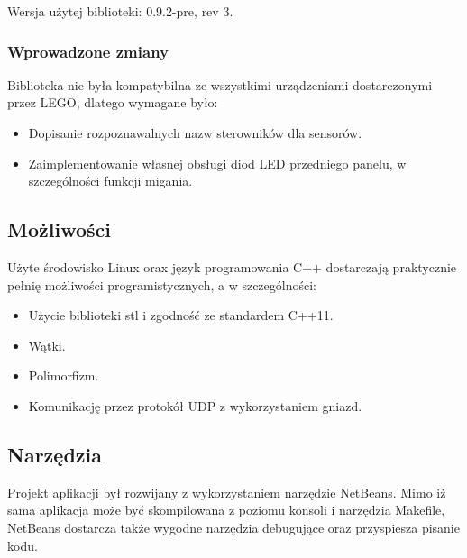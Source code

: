 \noindent Wersja użytej biblioteki: 0.9.2-pre, rev 3.

\subsubsection{Wprowadzone zmiany}
Biblioteka nie była kompatybilna ze wszystkimi urządzeniami dostarczonymi przez LEGO, dlatego wymagane było:
\begin{itemize}
    \item Dopisanie rozpoznawalnych nazw sterowników dla sensorów.
    \item Zaimplementowanie własnej obsługi diod LED przedniego panelu, w szczególności funkcji migania.
\end{itemize}

\subsection{Możliwości}
Użyte środowisko Linux orax język programowania C++ dostarczają praktycznie pełnię możliwości programistycznych, a w szczególności:
\begin{itemize}
    \item Użycie biblioteki stl i zgodność ze standardem C++11.
    \item Wątki.
    \item Polimorfizm.
    \item Komunikację przez protokół UDP z wykorzystaniem gniazd.
\end{itemize}

\subsection{Narzędzia}
Projekt aplikacji był rozwijany z wykorzystaniem narzędzie NetBeans. Mimo iż sama aplikacja może być skompilowana z poziomu konsoli i narzędzia Makefile, NetBeans dostarcza także wygodne narzędzia debugujące oraz przyspiesza pisanie kodu.

